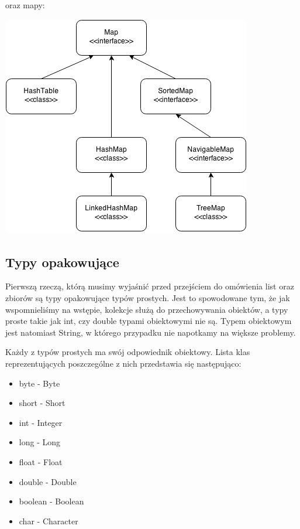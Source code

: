 \documentclass[letterpaper,10pt,english]{sphinxmanual}
\begin{document}
oraz mapy:

{\hfill\includegraphics{maps_collections.png}\hfill}


\subsection{Typy opakowujące}
\label{wyjkol:typy-opakowujace}
Pierwszą rzeczą, którą musimy wyjaśnić przed przejściem do omówienia list oraz zbiorów są typy opakowujące typów prostych. Jest to spowodowane tym, że jak wspomnieliśmy na wstępie, kolekcje służą do przechowywania obiektów, a typy proste takie jak int, czy double typami obiektowymi nie są. Typem obiektowym jest natomiast String, w którego przypadku nie napotkamy na większe problemy.

Każdy z typów prostych ma swój odpowiednik obiektowy. Lista klas reprezentujących poszczególne z nich przedstawia się następująco:
\begin{itemize}
\item {} 
byte - Byte

\item {} 
short - Short

\item {} 
int - Integer

\item {} 
long - Long

\item {} 
float - Float

\item {} 
double - Double

\item {} 
boolean - Boolean

\item {} 
char - Character

\end{itemize}
\end{document}
